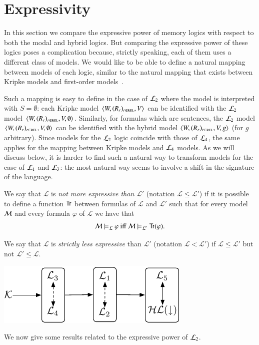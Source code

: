 \section{Expressivity}\label{expressivity}

In this section we compare the expressive power of memory logics
with respect to both the modal and hybrid logics.
But comparing the expressive power of these logics poses a complication
because, strictly speaking, each of them uses a different class of models.
We would like to be able to define a natural mapping between models
of each logic, similar to the natural mapping that exists between
Kripke models and first-order models~\cite{BRV01}.

Such a mapping is easy to define in the case of $\mathcal{L}_2$ where the model is interpreted with $S=\emptyset$: each
Kripke model $\langle W,(R_r)_{r \in \textsc{rel}},V \rangle$ can be identified with the $\mathcal{L}_2$
model $\langle W,(R_r)_{r \in \textsc{rel}}, V, \emptyset \rangle$. Similarly, for formulas
which are sentences, the $\mathcal{L}_2$ model $\langle W,(R_r)_{r \in \textsc{rel}},V,\emptyset \rangle$ can be identified with the hybrid model
$\langle W,(R_r)_{r \in \textsc{rel}},V,g \rangle$ (for $g$ arbitrary).
%
Since models for the $\mathcal{L}_2$ logic coincide with those of
$\mathcal{L}_4$, the same applies for the mapping between Kripke models
and $\mathcal{L}_4$ models.
%
As we will discuss below, it is harder to find such a natural way to
transform models for the case of $\mathcal{L}_1$ and $\mathcal{L}_3$: the most
natural way seems to involve a shift in the signature of the
language.

\begin{defn}
We say that
$\mathcal{L}$ is \emph{not more expressive than} $\mathcal{L'}$
(notation $\mathcal{L} \le \mathcal{L'}$) if it is possible to
define a function ${\sf Tr}$ between formulas of  $\mathcal{L}$ and $\mathcal{L'}$
such that for every model $\mathcal{M}$ and every formula $\varphi$ of $\mathcal{L}$
we have that
\[
\mathcal{M} \models_\mathcal{L} \varphi \mbox{ iff } \mathcal{M} \models_{\mathcal{L}'} {\sf Tr}(\varphi).
\]

We say that $\mathcal{L}$ is \emph{strictly less expressive} than $\mathcal{L'}$
(notation $\mathcal{L} < \mathcal{L'}$) if $\mathcal{L} \le \mathcal{L'}$ but
not $\mathcal{L}' \le \mathcal{L}$.
\end{defn}

\begin{center}
\includegraphics{picture-logics.pdf}
\end{center}
We now give some results related to the expressive power of
$\mathcal{L}_2$.

